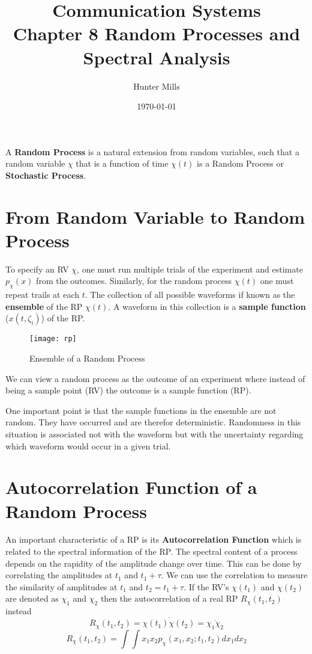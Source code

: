 \documentclass{article}
\title{Communication Systems \\
    \large Chapter 8 Random Processes and Spectral Analysis }
\author{Hunter Mills}
\date{\today}
\begin{document}
    \maketitle

    \medskip

    A \textbf{Random Process} is a natural extension from random variables, such that a random variable 
    $\chi$ that is a function of time $\chi(t)$ is a Random Process or \textbf{Stochastic Process}. 

    \section{From Random Variable to Random Process}
    To specify an RV $\chi$, one must run multiple trials of the experiment and estimate $p_{\chi}(x)$ 
    from the outcomes. Similarly, for the random process $\chi(t)$ one must repeat trails at each $t$.
    The collection of all possible waveforms if known as the \textbf{ensemble} of the RP $\chi(t)$. 
    A waveform in this collection is a \textbf{sample function} ($x(t, \zeta_i)$) of the RP.

    \begin{figure}[h]
        \centering
        \texttt{[image: rp]}
        \caption{Ensemble of a Random Process}
    \end{figure}

    We can view a random process as the outcome of an experiment where instead of being a sample point
    (RV) the outcome is a sample function (RP). 

    One important point is that the sample functions in the ensemble are not random. They have occurred
    and are therefor deterministic. Randomness in this situation is associated not with the waveform
    but with the uncertainty regarding which waveform would occur in a given trial. 

    \section{Autocorrelation Function of a Random Process}
    An important characteristic of a RP is its \textbf{Autocorrelation Function} which is related to the spectral information 
    of the RP. The spectral content of a process depends on the rapidity of the amplitude change over time. This can be done 
    by correlating the amplitudes at $t_1$ and $t_1 + \tau$. We can use the correlation to measure the similarity of amplitudes
    at $t_1$ and $t_2 = t_1 + \tau$. If the RV's $\chi(t_1)$ and $\chi(t_2)$ are denoted as $\chi_1$ and $\chi_2$ then the
    autocorrelation of a real RP $R_\chi(t_1, t_2)$ instead
    \begin{equation}
        R_\chi(t_1, t_2) = \overline{\chi(t_1)\chi(t_2)} = \overline{\chi_1\chi_2}
    \end{equation}
    \begin{equation}
        R_\chi(t_1, t_2) = \int\int x_1x_2p_{\chi}(x_1, x_2; t_1, t_2)dx_1 dx_2
    \end{equation}
\end{document}
